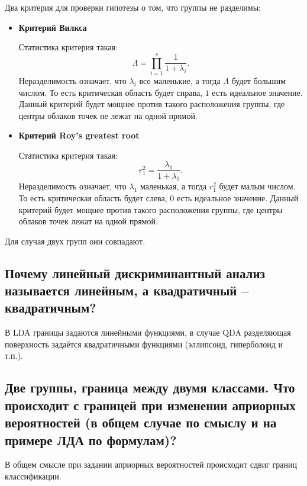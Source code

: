 \documentclass[12pt,a4paper,final]{article}
\newcommand{\1}{\mathds{1}}
\begin{document}
Два критерия для проверки гипотезы о том, что группы не разделимы:
\begin{itemize}

\item \textbf{Критерий Вилкса} 

Статистика критерия такая:
$$
\Lambda = \prod_{i = 1}^s \frac{1}{1+\lambda_i}.
$$
Неразделимость означает, что $\lambda_i$ все маленькие, а тогда $\Lambda$ будет большим числом. То есть критическая область будет справа, $1$ есть идеальное значение. Данный критерий будет мощнее против такого расположения группы, где центры облаков точек не лежат на одной прямой.

\item \textbf{Критерий Roy's greatest root} 

Статистика критерия такая:
$$
r^2_1 = \frac{\lambda_1}{1+\lambda_1}.
$$
Неразделимость означает, что $\lambda_1$ маленькая, а тогда $r^2_1$ будет малым числом. То есть критическая область будет слева, $0$ есть идеальное значение. Данный критерий будет мощнее против такого расположения группы, где центры облаков точек лежат на одной прямой.
\end{itemize} 
Для случая двух групп они совпадают.

\subsection{Почему линейный дискриминантный анализ называется линейным, а квадратичный – квадратичным?}

В LDA границы задаются линейными функциями, в случае QDA разделяющая поверхность задаётся квадратичными функциями (эллипсоид, гиперболоид и т.п.).

\subsection{Две группы, граница между двумя классами. Что происходит с границей при изменении априорных вероятностей (в общем случае по смыслу и на примере ЛДА по формулам)?}

В общем смысле при задании априорных вероятностей происходит сдвиг границ классификации. 
\end{document}
